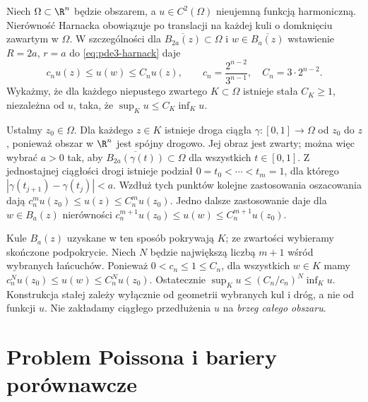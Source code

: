 \begin{uwaga}
Niech $\Omega\subset\R^n$ będzie obszarem, a
$u\in C^2(\Omega)$ nieujemną funkcją harmoniczną.
Nierówność Harnacka obowiązuje po translacji
na każdej kuli o domknięciu zawartym w $\Omega$.
W szczególności dla $\overline{B_{2a}(z)}\subset\Omega$
i $w\in\overline{B_a(z)}$ wstawienie $R=2a$, $r=a$
do \eqref{eq:pde3-harnack} daje
\[
 c_n u(z)\leq u(w)\leq C_n u(z),\qquad
 c_n=\frac{2^{n-2}}{3^{n-1}},\quad C_n=3\cdot2^{n-2}.
\]
Wykażmy, że dla każdego niepustego zwartego
$K\subset\Omega$ istnieje stała $C_K\geq1$,
niezależna od $u$, taka, że
$\sup_K u\leq C_K\inf_K u$.

Ustalmy $z_0\in\Omega$. Dla każdego $z\in K$
istnieje droga ciągła $\gamma\colon[0,1]\to\Omega$
od $z_0$ do $z$, ponieważ obszar w $\R^n$ jest
spójny drogowo. Jej obraz jest zwarty; można więc
wybrać $a>0$ tak, aby
$\overline{B_{2a}(\gamma(t))}\subset\Omega$ dla
wszystkich $t\in[0,1]$.
Z jednostajnej ciągłości drogi istnieje podział
$0=t_0<\cdots<t_m=1$, dla którego
$|\gamma(t_{j+1})-\gamma(t_j)|<a$.
Wzdłuż tych punktów kolejne zastosowania oszacowania
dają $c_n^m u(z_0)\leq u(z)\leq C_n^m u(z_0)$.
Jedno dalsze zastosowanie daje dla $w\in B_a(z)$
nierówności
$c_n^{m+1}u(z_0)\leq u(w)\leq C_n^{m+1}u(z_0)$.

Kule $B_a(z)$ uzyskane w ten sposób pokrywają $K$;
ze zwartości wybieramy skończone podpokrycie.
Niech $N$ będzie największą liczbą $m+1$
wśród wybranych łańcuchów. Ponieważ
$0<c_n\leq1\leq C_n$, dla wszystkich $w\in K$
mamy $c_n^N u(z_0)\leq u(w)\leq C_n^N u(z_0)$.
Ostatecznie $\sup_Ku\leq (C_n/c_n)^N\inf_Ku$.
Konstrukcja stałej zależy wyłącznie od geometrii
wybranych kul i dróg, a nie od funkcji $u$.
Nie zakładamy ciągłego przedłużenia $u$ na
\emph{brzeg całego obszaru}.
\end{uwaga}

\section{Problem Poissona i bariery porównawcze}
\label{sec:pde3-poisson-equation}

